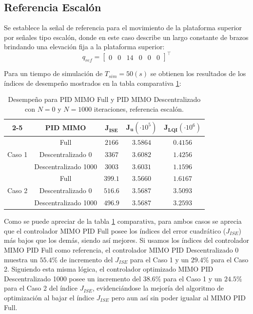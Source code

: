 \subsection{Referencia Escalón}

Se establece la señal de referencia para el movimiento de la plataforma superior por señales tipo escalón, donde en este caso describe un largo constante de brazos brindando una elevación fija a la plataforma superior:
\begin{equation} 
    q_{ref} = \begin{bmatrix}
        0 & 0 & 14 & 0 & 0 & 0
    \end{bmatrix}^{\top}
\end{equation}

Para un tiempo de simulación de $T_{sim}=50(s)$ se obtienen los resultados de los índices de desempeño mostrados en la tabla comparativa \ref{tab:indices_mimopid_escalon}:

\begin{table}[ht]
\centering
\begin{tabular}{c|c|c|c|c|}
\cline{2-5}
    & \textbf{PID MIMO} & $\mathbf{J_{ISE}}$ & $\mathbf{J_{u}}(\cdot10^5)$ & $\mathbf{J_{LQI}}(\cdot10^6)$ \\ \hline
\multicolumn{1}{|c|}{\multirow{3}{*}{Caso 1}} &  Full               & $2166$  & $3.5864$  & $0.4156$ \\ \cline{2-5} 
\multicolumn{1}{|c|}{}                        & Descentralizado 0   & $3367$  & $3.6082$  & $1.4256$ \\ \cline{2-5} 
\multicolumn{1}{|c|}{}                        & Descentralizado 1000& $3003$  & $3.6031$  & $1.1596$ \\ \hline
\multicolumn{1}{|c|}{\multirow{3}{*}{Caso 2}} & Full                & $399.1$ & $3.5660$  & $1.6167$ \\ \cline{2-5} 
\multicolumn{1}{|c|}{}                        & Descentralizado 0   & $516.6$ & $3.5687$  & $3.5093$ \\ \cline{2-5} 
\multicolumn{1}{|c|}{}                        & Descentralizado 1000& $496.9$ & $3.5687$  & $3.2593$ \\ \hline
\end{tabular}
\caption{Desempeño para PID MIMO Full y PID MIMO Descentralizado con $N=0$ y $N=1000$ iteraciones, referencia escalón.}
\label{tab:indices_mimopid_escalon}
\end{table}

Como se puede apreciar de la tabla \ref{tab:indices_mimopid_escalon} comparativa, para ambos casos se aprecia que el controlador MIMO PID Full posee los índices del error cuadrático ($J_{ISE}$) más bajos que los demás, siendo así mejores. Si usamos los índices del controlador MIMO PID Full como referencia, el controlador MIMO PID Descentralizado 0 muestra un $55.4\%$ de incremento del $J_{ISE}$ para el Caso 1 y un $29.4\%$ para el Caso 2. Siguiendo esta misma lógica, el controlador optimizado MIMO PID Descentralizado 1000 posee un incremento del $38.6\%$ para el Caso 1 y un $24.5\%$ para el Caso 2 del índice $J_{ISE}$, evidenciándose la mejoría del algoritmo de optimización al bajar el índice $J_{ISE}$ pero aun así sin poder igualar al MIMO PID Full.

